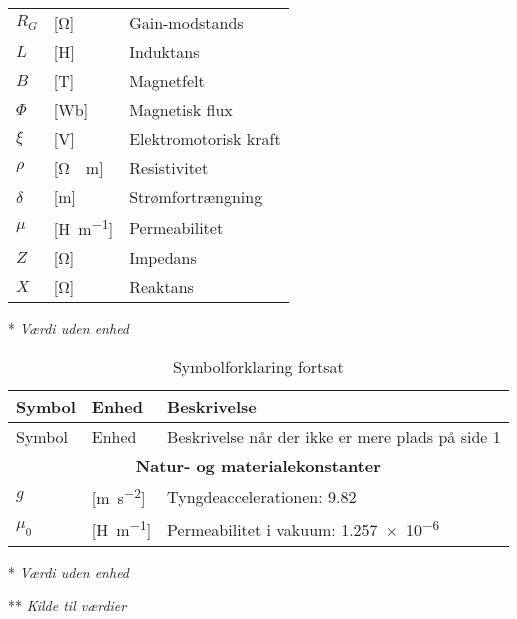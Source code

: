 \begin{table}[h!]
\begin{threeparttable}
\begin{tabular}{l l l}
$R_G$				&	[\si{\ohm}]					& Gain-modstands\\
$L$					&	[\si{\henry}]				& Induktans\\
$B$					&	[\si{\tesla}]				& Magnetfelt\\
$\Phi$				&	[\si{\weber}]				& Magnetisk flux\\
$\xi$				&	[\si{\volt}]				& Elektromotorisk kraft\\
$\rho$				&	[\si{\ohm\cdot\m}]			& Resistivitet\\
$\delta$			&	[\si{\m}]					& Strømfortrængning\\
$\mu$				&	[\si{\henry\per\m}]			& Permeabilitet\\
$Z$					&	[\si{\ohm}]					& Impedans\\	
$X$					&	[\si{\ohm}]					& Reaktans\\
\bottomrule
\end{tabular}
\begin{tablenotes}
\item[*] \textit{Værdi uden enhed}
\end{tablenotes}
\end{threeparttable}
\end{table}




\begin{table}[h!]
\centering
\caption{Symbolforklaring fortsat}
\label{tab:symboler2}
\begin{threeparttable}
\begin{tabular}{l l l}
\toprule
\multicolumn{1}{l}{Symbol}       &
\multicolumn{1}{l}{Enhed}        &
\multicolumn{1}{l}{Beskrivelse}  \\ 
\midrule

Symbol & Enhed & Beskrivelse når der ikke er mere plads på side 1 \\

\midrule
\multicolumn{3}{c}{\textbf{Natur- og materialekonstanter\tnote{**}}}       \\
\midrule
$g$         &	[\si{\meter\per\second^2}]		&	Tyngdeaccelerationen: \num{9,82} \\
$\mu_0$		&	[\si{\henry\per\meter}]			&	Permeabilitet i vakuum: \num{1,257e-6} \\
\bottomrule
\end{tabular}
\begin{tablenotes}
\item[*] \textit{Værdi uden enhed}
\item[**] \textit{Kilde til værdier \cite{Halliday2014}}
\end{tablenotes}
\end{threeparttable}
\end{table}
